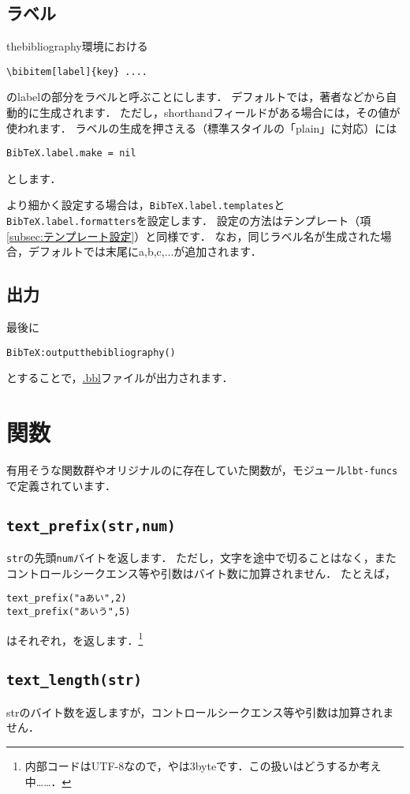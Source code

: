 \documentclass[a4paper]{ltjsarticle}
\newcommand{\luafunc}[1]{\texttt{#1}}
\newcommand*{\luavar}[1]{\texttt{#1}}
\begin{document}
\subsection{ラベル}
thebibliography環境における
\begin{lstlisting}[language={[latex]TeX}]
\bibitem[label]{key} ....
\end{lstlisting}
のlabelの部分をラベルと呼ぶことにします．
デフォルトでは，著者などから自動的に生成されます．
ただし，shorthandフィールドがある場合には，その値が使われます．
ラベルの生成を押さえる（標準スタイルの「plain」に対応）には
\begin{lstlisting}
BibTeX.label.make = nil
\end{lstlisting}
とします．

より細かく設定する場合は，\luavar{BibTeX.label.templates}と\luavar{BibTeX.label.formatters}を設定します．
設定の方法はテンプレート（項\ref{subsec:テンプレート設定}）と同様です．
なお，同じラベル名が生成された場合，デフォルトでは末尾にa,b,c,...が追加されます．

\subsection{出力}
最後に
\begin{lstlisting}
BibTeX:outputthebibliography()
\end{lstlisting}
とすることで，\url{.bbl}ファイルが出力されます．

\section{関数}\label{sec:関数}
有用そうな関数群やオリジナルの\BibTeX に存在していた関数が，モジュール\luavar{lbt-funcs}で定義されています．
\subsection{\luafunc{text\_prefix(str,num)}}
\luavar{str}の先頭\luavar{num}バイトを返します．
ただし，文字を途中で切ることはなく，またコントロールシークエンス等や引数はバイト数に加算されません．
たとえば，
\begin{lstlisting}
text_prefix("aあい",2)
text_prefix("あいう",5)
\end{lstlisting}
はそれぞれ，を返します．\footnote{内部コードはUTF-8なので，やは3byteです．この扱いはどうするか考え中……．}

\subsection{\luafunc{text\_length(str)}}
strのバイト数を返しますが，コントロールシークエンス等や引数は加算されません．
\end{document}
